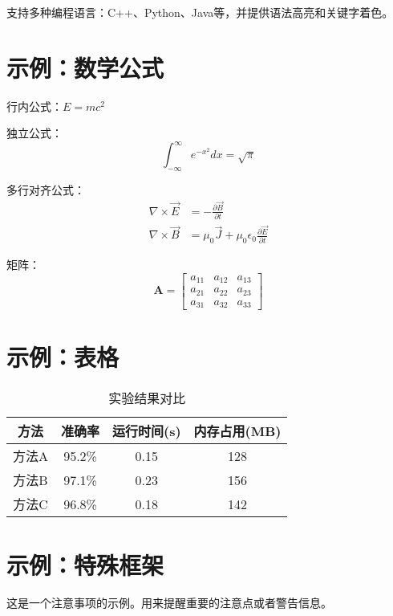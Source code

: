 \documentclass[12pt,a4paper]{article}
\numberwithin{equation}{section}
\newcommand{\mat}[1]{\boldsymbol{#1}}
\newcommand{\note}[1]{\begin{tcolorbox}[colback=orange!10,colframe=orange!80,title=注意,fonttitle=\bfseries\color{white},sharp corners]#1\end{tcolorbox}}
\begin{document}
支持多种编程语言：C++、Python、Java等，并提供语法高亮和关键字着色。

\section{示例：数学公式}

行内公式：$E = mc^2$

独立公式：
\begin{equation}
\int_{-\infty}^{\infty} e^{-x^2} dx = \sqrt{\pi}
\label{eq:gaussian}
\end{equation}

多行对齐公式：
\begin{align}
\nabla \times \vec{E} &= -\frac{\partial \vec{B}}{\partial t} \\
\nabla \times \vec{B} &= \mu_0 \vec{J} + \mu_0 \epsilon_0 \frac{\partial \vec{E}}{\partial t}
\end{align}

矩阵：
\begin{equation}
\mat{A} = \begin{bmatrix}
a_{11} & a_{12} & a_{13} \\
a_{21} & a_{22} & a_{23} \\
a_{31} & a_{32} & a_{33}
\end{bmatrix}
\end{equation}

\section{示例：表格}

\begin{table}[H]
\centering
\caption{实验结果对比}
\begin{tabular}{|c|c|c|c|}
\hline
\textbf{方法} & \textbf{准确率} & \textbf{运行时间(s)} & \textbf{内存占用(MB)} \\
\hline
方法A & 95.2\% & 0.15 & 128 \\
\hline
方法B & 97.1\% & 0.23 & 156 \\
\hline
方法C & 96.8\% & 0.18 & 142 \\
\hline
\end{tabular}
\label{tab:results}
\end{table}

\section{示例：特殊框架}

\note{这是一个注意事项的示例。用来提醒重要的注意点或者警告信息。}
\end{document}
